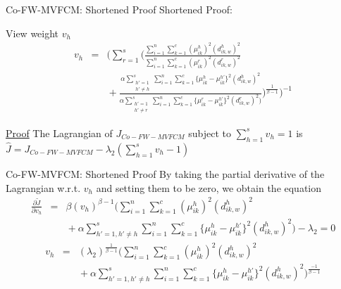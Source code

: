 \documentclass[compress,sky blue]{beamer}
\begin{document}
\begin{frame}{Co-FW-MVFCM: Shortened Proof}
\vspace{-0.7cm}
Shortened Proof:
\begin{exampleblock}{View weight $v_{h}$}
\begin{eqnarray*}
  v_{h} & = & \Bigg ( \sum_{r=1}^{s} \bigg ( \frac { \sum_{i=1}^{n}\sum_{k=1}^{c} (\mu_{ik}^{h})^{2} (d_{ik,w}^{h})^{2} }  {\sum_{i=1}^{n}\sum_{k=1}^{c} (\mu_{ik}^{r})^{2} (d_{ik,w}^{r})^{2}   }\\
  & & {} + \frac{  \alpha \sum_{\substack{h'= 1\\ h'\ne h}}^{s} \sum_{i=1}^{n}\sum_{k=1}^{c}\{ \mu_{ik}^{h}-\mu_{ik}^{h'} \}^{2}(d_{ik,w}^{h})^{2} } {  \alpha \sum_{\substack{h'= 1\\ h'\ne r}}^{s} \sum_{i=1}^{n}\sum_{k=1}^{c}\{ \mu_{ik}^{r}-\mu_{ik}^{h'} \}^{2}(d_{ik,w}^{r})^{2}  \big )}  \bigg ) ^\frac{1}{\beta-1}\Bigg )^{-1}
\end{eqnarray*}
\end{exampleblock}
\underline{Proof} The Lagrangian of $J_{Co-FW-MVFCM}$  subject to $\sum_{h=1}^{s}v_{h}=1 $ is  $\hat{J}=J_{Co-FW-MVFCM}-\lambda_{2} \left(\sum_{h=1}^{s}v_{h} -1 \right)$\\

\end{frame}


\begin{frame}{Co-FW-MVFCM: Shortened Proof}
By taking the partial derivative of the Lagrangian w.r.t. $v_{h}$  and setting them to be zero, we obtain the equation  
\begin{eqnarray*}
 \scriptstyle \frac{\partial \tilde{J}}{\partial v_{h}} &\scriptstyle =&\scriptstyle \beta (v_{h})^{\beta-1}\big(\sum_{i=1}^{n}\sum_{k=1}^{c} (\mu_{ik}^{h})^{2} (d_{ik,w}^{h})^{2}\\
 &&  {} \scriptstyle + \alpha \sum_{h'=1,h'\neq h}^{s} \sum_{i=1}^{n}\sum_{k=1}^{c} \{ \mu_{ik}^{h}-\mu_{ik}^{h'} \}^{2} (d_{ik,w}^{h})^{2} \big) - \lambda_{2}=0
\end{eqnarray*}\begin{eqnarray*} 
\scriptstyle v_{h}&\scriptstyle =&\scriptstyle (\lambda_{2})^\frac{1}{\beta-1} \big ( \sum_{i=1}^{n}\sum_{k=1}^{c} (\mu_{ik}^{h})^{2} (d_{ik,w}^{h})^{2}\\
  &&  {} \scriptstyle + \alpha \sum_{h'=1,h'\neq h}^{s} \sum_{i=1}^{n}\sum_{k=1}^{c} \{ \mu_{ik}^{h}-\mu_{ik}^{h'} \}^{2} (d_{ik,w}^{h})^{2} \big)^\frac{-1}{\beta-1}
\end{eqnarray*}
\end{frame}
\end{document}
